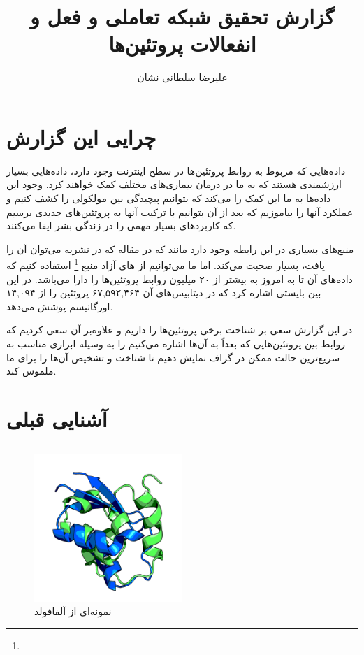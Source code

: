 \documentclass[10pt, a4paper]{article}
\title{گزارش تحقیق شبکه تعاملی و فعل و انفعالات پروتئین‌ها}
\author{\href{mailto:a.soltani@iau-tnb.ac.ir}{علیرضا سلطانی نشان}}
\begin{document}
\maketitle

\section{چرایی این گزارش}

داده‌هایی که مربوط به روابط پروتئین‌ها در سطح اینترنت وجود دارد، داده‌هایی بسیار
ارزشمندی هستند که به ما در درمان بیماری‌های مختلف کمک خواهند کرد. وجود این
داده‌ها به ما این کمک را می‌کند که بتوانیم پیچیدگی بین مولکولی را کشف کنیم و
عملکرد آنها را بیاموزیم که بعد از آن بتوانیم با ترکیب آنها به پروتئین‌های جدیدی
برسیم که کاربرد‌های بسیار مهمی را در زندگی بشر ایفا می‌کنند.

منبع‌های بسیاری در این رابطه وجود دارد مانند  \cite{konc2022protein}
که در مقاله  که در نشریه 
می‌توان آن را یافت، بسیار صحبت می‌کند. اما ما می‌توانیم از های آزاد منبع
 \footnote{  } استفاده کنیم که داده‌های آن تا به امروز به بیشتر
از ۲۰ میلیون روابط پروتئین‌ها را دارا می‌باشد. در این بین بایستی اشاره کرد که در
دیتابیس‌های آن ۶۷,۵۹۲,۴۶۴ پروتئین را از ۱۴,۰۹۴ اورگانیسم پوشش می‌دهد.

در این گزارش سعی بر شناخت برخی پروتئین‌ها را داریم و علاوه‌بر آن سعی کردیم که
روابط بین پروتئین‌هایی که بعداً به آن‌ها اشاره‌ می‌کنیم را به وسیله ابزاری مناسب
به سریع‌ترین حالت ممکن در گراف نمایش دهیم تا شناخت و تشخیص آن‌ها را برای ما
ملموس کند.

\section{آشنایی قبلی}

\subsection{}

\begin{figure}[H]
    \centering
    \includegraphics[width=0.5\textwidth]{images/sample_alphafold.png}
    \caption{نمونه‌ای از آلفافولد}
    \label{fig: alphafold}
\end{figure}
\end{document}
